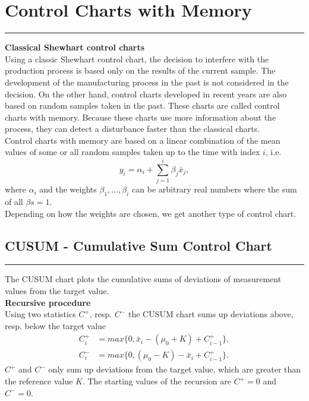 \section{Control Charts with Memory}
\noindent\rule[\linienAbstand]{\linewidth}{\linienDickeDick}

\textbf{Classical Shewhart control charts}\\
Using a classic Shewhart control chart, the decision to interfere with the production process is based only on the results of the current sample.
The development of the manufacturing process in the past is not considered in the decision. On the other hand, control charts developed in recent years are also based on random samples taken in the past.
These charts are called control charts with memory.
Because these charts use more information about the process, they can detect a disturbance faster than the classical charts.\\

Control charts with memory are based on a linear combination of the mean values of some or all random samples taken up to the time with index $i$, i.e.
\begin{equation}
 y_i = \alpha_i + \sum_{j=1}^i \beta_j \bar{x}_j,
\end{equation}
where $\alpha_i$ and the weights $\beta_1, ..., \beta_i$ can be arbitrary real numbers where the sum of all $\beta s = 1$.\\
Depending on how the weights are chosen, we get another type of control chart.

\subsection{CUSUM - Cumulative Sum Control Chart}
\noindent\rule[\linienAbstand]{\linewidth}{\linienDicke}
The CUSUM chart plots the cumulative sums of deviations of measurement values from the target value.\\

\textbf{Recursive procedure}\\
Using two statistics $C^+$, resp. $C^-$ the CUSUM chart sums up deviations above, resp. below the target value
\begin{equation}
  \begin{split}
    C^+_i &= max\{0, \bar{x}_i - (\mu_0 + K) + C_{i-1}^+\},\\
    C^-_i &= max\{0, (\mu_0 - K) - \bar{x}_i + C_{i-1}^+\}.
  \end{split}
\end{equation}
$C^+$ and $C^-$ only sum up deviations from the target value, which are greater than the reference value $K$.
The starting values of the recursion are $C^+ = 0$ and $C^- = 0$.\\

